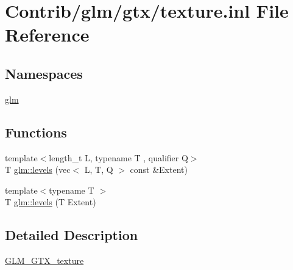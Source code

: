 \hypertarget{texture_8inl}{}\section{Contrib/glm/gtx/texture.inl File Reference}
\label{texture_8inl}
\subsection*{Namespaces}
\begin{DoxyCompactItemize}
\item 
 \mbox{\hyperlink{namespaceglm}{glm}}
\end{DoxyCompactItemize}
\subsection*{Functions}
\begin{DoxyCompactItemize}
\item 
{\footnotesize template$<$length\+\_\+t L, typename T , qualifier Q$>$ }\\T \mbox{\hyperlink{group__gtx__texture_gaa8c377f4e63486db4fa872d77880da73}{glm\+::levels}} (vec$<$ L, T, Q $>$ const \&Extent)
\item 
{\footnotesize template$<$typename T $>$ }\\T \mbox{\hyperlink{namespaceglm_a13b06d94548039531a8d6af1a0c3e0c5}{glm\+::levels}} (T Extent)
\end{DoxyCompactItemize}


\subsection{Detailed Description}
\mbox{\hyperlink{group__gtx__texture}{G\+L\+M\+\_\+\+G\+T\+X\+\_\+texture}} 